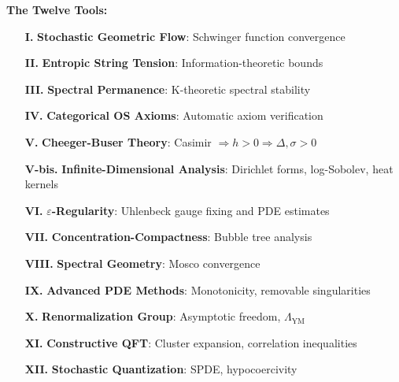 \begin{theorem}
\textbf{The Twelve Tools:}
\begin{enumerate}
\item[\textbf{I.}] \textbf{Stochastic Geometric Flow}: Schwinger function convergence
\item[\textbf{II.}] \textbf{Entropic String Tension}: Information-theoretic bounds
\item[\textbf{III.}] \textbf{Spectral Permanence}: K-theoretic spectral stability
\item[\textbf{IV.}] \textbf{Categorical OS Axioms}: Automatic axiom verification
\item[\textbf{V.}] \textbf{Cheeger-Buser Theory}: Casimir $\Rightarrow h > 0 \Rightarrow \Delta, \sigma > 0$
\item[\textbf{V-bis.}] \textbf{Infinite-Dimensional Analysis}: Dirichlet forms, log-Sobolev, heat kernels
\item[\textbf{VI.}] \textbf{$\varepsilon$-Regularity}: Uhlenbeck gauge fixing and PDE estimates
\item[\textbf{VII.}] \textbf{Concentration-Compactness}: Bubble tree analysis
\item[\textbf{VIII.}] \textbf{Spectral Geometry}: Mosco convergence
\item[\textbf{IX.}] \textbf{Advanced PDE Methods}: Monotonicity, removable singularities
\item[\textbf{X.}] \textbf{Renormalization Group}: Asymptotic freedom, $\Lambda_{\text{YM}}$
\item[\textbf{XI.}] \textbf{Constructive QFT}: Cluster expansion, correlation inequalities
\item[\textbf{XII.}] \textbf{Stochastic Quantization}: SPDE, hypocoercivity
\end{enumerate}
\end{theorem}

